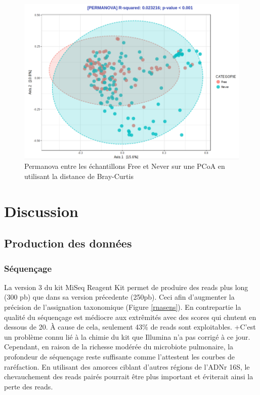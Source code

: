 \documentclass[12pt,a4paper]{article}
\begin{document}
\begin{figure}[t]
\begin{center}
\includegraphics[scale=0.50]{img/pcoa.png}\hfill
\end{center}
\caption{Permanova entre les échantillons Free et Never sur une PCoA en utilisant la distance de Bray-Curtis}
\label{pcoa}
\end{figure}

\newpage
\section{Discussion}
\subsection{Production des données}
\subsubsection{Séquençage}
La version 3 du kit MiSeq Reagent Kit permet de produire des reads plus long (300 pb) que dans sa version précedente (250pb). Ceci afin d'augmenter la précision de l'assignation taxonomique (Figure \ref{rnasens}). En contrepartie la qualité du séquençage est médiocre aux extrêmités avec des scores qui chutent en dessous de 20. À cause de cela, seulement 43\% de reads sont exploitables. 
 +C'est un problème connu lié à la chimie du kit que Illumina n'a pas corrigé à ce jour. Cependant, en raison de la richesse modérée du microbiote pulmonaire, la profondeur de séquençage reste suffisante comme l'attestent les courbes de raréfaction. En utilisant des amorces ciblant d'autres régions de l'ADNr 16S, le chevauchement des reads pairés pourrait être plus important et éviterait ainsi la perte des reads. 
\end{document}
